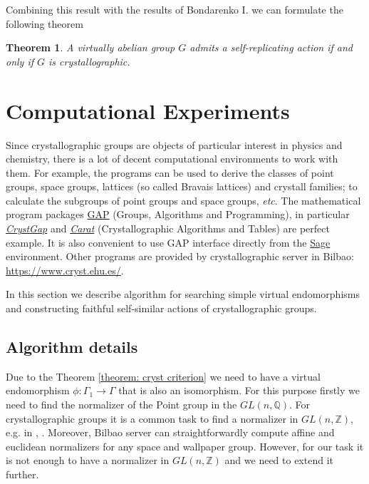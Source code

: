 \documentclass[a4paper,12pt]{amsart}
\newtheorem{theorem}{Theorem}
\theoremstyle{definition}
\begin{document}
	Combining this result with the results of Bondarenko I. we can formulate the following theorem
	\begin{theorem}
		A virtually abelian group $G$ admits a self-replicating action if and only if $G$ is crystallographic.
	\end{theorem}

	\newpage
	\section{Computational Experiments} \label{section:experiments}
	Since crystallographic groups are objects of particular interest in physics and chemistry, there is a lot of decent computational environments to work with them. For example, the programs can be used to derive the classes of point groups, space groups, lattices (so called Bravais lattices) and crystall families; to calculate the subgroups of point groups and space groups, \textit{etc}. The mathematical program packages \href{https://www.gap-system.org/}{GAP} (Groups, Algorithms and Programming), in particular \href{https://www.gap-system.org/Packages/cryst.html}{\textit{CrystGap}} and \href{https://lbfm-rwth.github.io/carat/}{\textit{Carat}} (Crystallographic Algorithms and Tables) are perfect example. It is also convenient to use GAP interface directly from the \href{https://www.sagemath.org/}{Sage} environment. Other programs are provided by crystallographic server in Bilbao: \href{https://www.cryst.ehu.es/}{https://www.cryst.ehu.es/}.
	
	In this section we describe algorithm for searching simple virtual endomorphisms and constructing faithful self-similar actions of crystallographic groups.  
	
	\subsection{Algorithm details} Due to the Theorem \ref{theorem: cryst criterion} we need to have a virtual endomorphism $\phi: \Gamma_1 \rightarrow \Gamma$ that is also an isomorphism. 
	For this purpose firstly we need to find the normalizer of the Point group in the $GL(n, \mathbb{Q})$. For crystallographic groups it is a common task to find a normalizer in $GL(n, \mathbb{Z})$, e.g. in \cite{cryst:international tables}, \cite{cryst:group_theory}. Moreover, Bilbao server \cite{cryts: online tool} can straightforwardly compute affine and euclidean normalizers for any space and wallpaper group. However, for our task it is not enough to have a normalizer in $GL(n, \mathbb{Z})$ and we need to extend it further.
	
\end{document}
